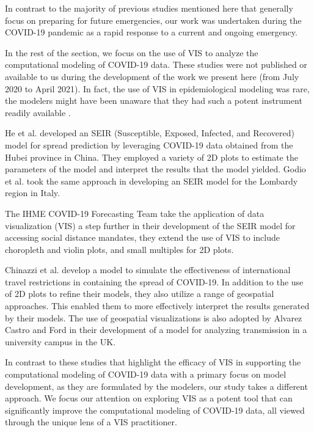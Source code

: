 In contrast to the majority of previous studies mentioned here that generally focus on preparing for future emergencies, our work was undertaken during the COVID-19 pandemic as a rapid response to a current and ongoing emergency.


In the rest of the section, we focus on the use of \ac{VIS} to analyze the computational modeling of COVID-19 data.
These studies were not published or available to us during the development of the work we present here (from July 2020 to April 2021).
In fact, the use of VIS in epidemiological modeling was rare, the modelers might have been unaware that they had such a potent instrument readily available \cite{chen2022RAMPVIS}.

He et al. \cite{he2020SEIR} developed an SEIR (Susceptible, Exposed, Infected, and Recovered) model for spread prediction by leveraging COVID-19 data obtained from the Hubei province in China.
They employed a variety of 2D plots to estimate the parameters of the model and interpret the results that the model yielded. Godio et al. \cite{godio2020SEIR} took the same approach in developing an SEIR model for the Lombardy region in Italy.

The IHME COVID-19 Forecasting Team \cite{ihmecovid-19forecastingteam2021Modeling} take the application of data visualization (VIS) a step further in their development of the SEIR model for accessing social distance mandates, they extend the use of \ac{VIS} to include choropleth and violin plots, and small multiples for 2D plots.

Chinazzi et al. \cite{chinazzi2020Effect} develop a model to simulate the effectiveness of international travel restrictions in containing the spread of COVID-19.
In addition to the use of 2D plots to refine their models, they also utilize a range of geospatial approaches.
This enabled them to more effectively interpret the results generated by their models.
The use of geospatial visualizations is also adopted by Alvarez Castro and Ford \cite{alvarezcastro20213D} in their development of a model for analyzing transmission in a university campus in the UK.

In contrast to these studies that highlight the efficacy of \ac{VIS} in supporting the computational modeling of COVID-19 data with a primary focus on model development, as they are formulated by the modelers, our study takes a different approach.
We focus our attention on exploring \ac{VIS} as a potent tool that can significantly improve the computational modeling of COVID-19 data, all viewed through the unique lens of a \ac{VIS} practitioner.
